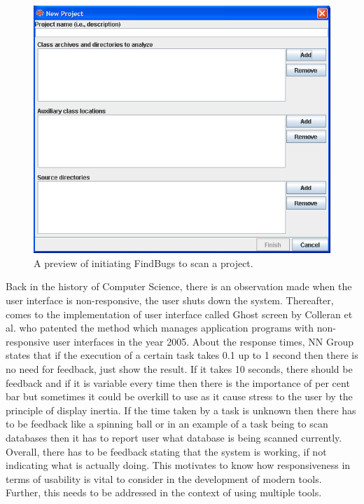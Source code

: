 \begin{figure}[hbt!]
	\centering
	\includegraphics[width=\linewidth]{figures/findbugs-scan}
	\caption{A preview of initiating FindBugs to scan a project. \cite{findbugs}}
	\label{fig:findbugs-scan}
\end{figure}

Back in the history of Computer Science, there is an observation made when the user interface is non-responsive, the user shuts down the system. Thereafter, comes to the implementation of user interface called Ghost screen by Colleran et al. \cite{colleran} who patented the method which manages application programs with non-responsive user interfaces in the year 2005. About the response times, NN Group \cite{nn} states that if the execution of a certain task takes 0.1 up to 1 second then there is no need for feedback, just show the result. If it takes 10 seconds, there should be feedback and if it is variable every time then there is the importance of per cent bar \cite{Borman} but sometimes it could be overkill to use as it cause stress to the user by the principle of display inertia. If the time taken by a task is unknown then there has to be feedback like a spinning ball or in an example of a task being to scan databases then it has to report user what database is being scanned currently. Overall, there has to be feedback stating that the system is working, if not indicating what is actually doing. This motivates to know how responsiveness in terms of usability is vital to consider in the development of modern tools. Further, this needs to be addressed in the context of using multiple tools.\\ \\


